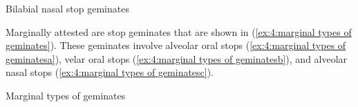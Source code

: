 \ea\label{ex:4:bilabial nasal stop geminates}
{Bilabial nasal stop geminates}

    \z
\z

Marginally attested are stop geminates that are shown in (\ref{ex:4:marginal types of geminates}). These geminates involve alveolar oral stops (\ref{ex:4:marginal types of geminatesa}), velar oral stops (\ref{ex:4:marginal types of geminatesb}), and alveolar nasal stops (\ref{ex:4:marginal types of geminatesc}).

\ea\label{ex:4:marginal types of geminates}
{Marginal types of geminates}

